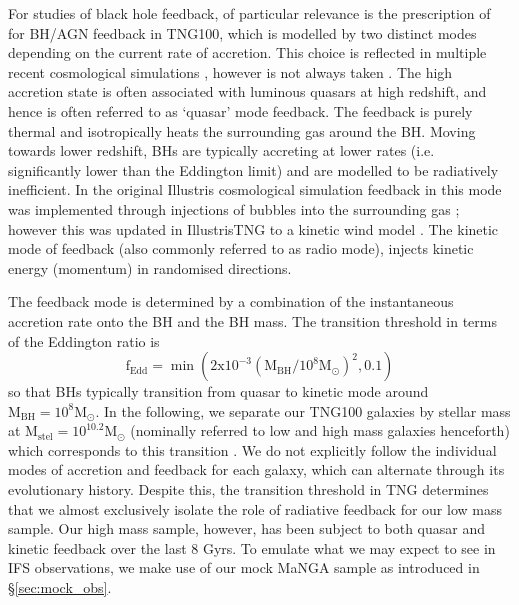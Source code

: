 For studies of black hole feedback, of particular relevance is the prescription of \citet{weinberger17} for BH/AGN feedback in TNG100, which is modelled by two distinct modes depending on the current rate of accretion. This choice is reflected in multiple recent cosmological simulations \citep[][]{sijacki2007, dubois2014}, however is not always taken \citep[e.g.][]{schaye2015}. The high accretion state is often associated with luminous quasars at high redshift, and hence is often referred to as `quasar' mode feedback. The feedback is purely thermal and isotropically heats the surrounding gas around the BH. Moving towards lower redshift, BHs are typically accreting at lower rates (i.e. significantly lower than the Eddington limit) and are modelled to be radiatively inefficient. In the original Illustris cosmological simulation feedback in this mode was implemented through injections of bubbles into the surrounding gas \citep{sijacki2007}; however this was updated in IllustrisTNG to a kinetic wind model \citep{weinberger17}. The kinetic mode of feedback (also commonly referred to as radio mode), injects kinetic energy (momentum) in randomised directions. 

The feedback mode is determined by a combination of the instantaneous accretion rate onto the BH and the BH mass. The transition threshold in terms of the Eddington ratio is 
\begin{equation}
\mathrm{f_{Edd}= \min ( 2x10^{-3}(M_{BH}/10^8 M_{\odot})^2 , 0.1)}
\end{equation}
so that BHs typically transition from quasar to kinetic mode around $\mathrm{M_{BH} = 10^{8}M_{\odot}}$. In the following, we separate our TNG100 galaxies by stellar mass at $\mathrm{M_{stel} = 10^{10.2}M_{\odot}}$ (nominally referred to low and high mass galaxies henceforth) which corresponds to this transition \citep[i.e. $\mathrm{M_{BH} \approx 10^{8}M_{\odot}}$, see Fig 1 in][]{li2019}. We do not explicitly follow the individual modes of accretion and feedback for each galaxy, which can alternate through its evolutionary history. Despite this, the transition threshold in TNG determines that we almost exclusively isolate the role of radiative feedback for our low mass sample. Our high mass sample, however, has been subject to both quasar and kinetic feedback over the last 8 Gyrs. To emulate what we may expect to see in IFS observations, we make use of our mock MaNGA sample as introduced in \S\ref{sec:mock_obs}.

